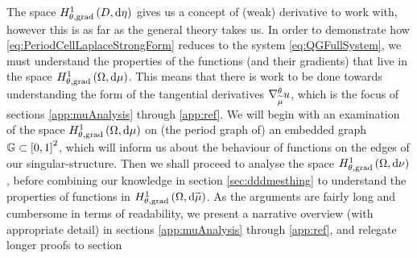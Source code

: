 The space $H^1_{\theta, \mathrm{grad}}\left( D, \mathrm{d}\eta \right)$ gives us a concept of (weak) derivative to work with, however this is as far as the general theory takes us.
In order to demonstrate how \eqref{eq:PeriodCellLaplaceStrongForm} reduces to the system \eqref{eq:QGFullSystem}, we must understand the properties of the functions (and their gradients) that live in the space $H^1_{\theta, \mathrm{grad}}\left( \Omega, \mathrm{d}\mu \right)$.
This means that there is work to be done towards understanding the form of the tangential derivatives $\nabla^{\theta}_{\widetilde{\mu}}u$, which is the focus of sections \ref{app:muAnalysis} through \ref{app:ref}.
We will begin with an examination of the space $H^1_{\theta, \mathrm{grad}}\left( \Omega, \mathrm{d}\mu \right)$ on (the period graph of) an embedded graph $\mathbb{G}\subset\left[ 0,1 \right]^2$, which will inform us about the behaviour of functions on the edges of our singular-structure.
Then we shall proceed to analyse the space $H^1_{\theta, \mathrm{grad}}\left( \Omega, \mathrm{d}\nu \right)$, before combining our knowledge in section \ref{sec:dddmesthing} to understand the properties of functions in $H^1_{\theta, \mathrm{grad}}\left( \Omega, \mathrm{d}\widetilde{\mu} \right)$.
As the arguments are fairly long and cumbersome in terms of readability, we present a narrative overview (with appropriate detail) in sections \ref{app:muAnalysis} through \ref{app:ref}, and relegate longer proofs to section 

